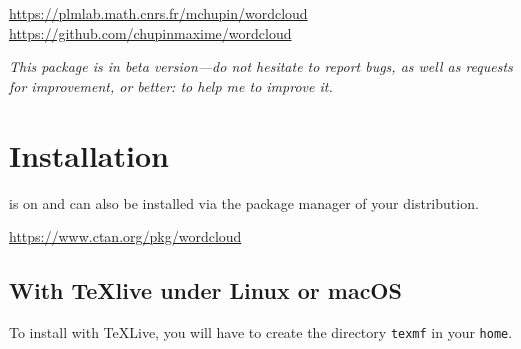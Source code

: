 \documentclass[english]{ltxdoc}
\begin{document}

\begin{abstract}
  These  and  packages allows drawing
  wordclouds from a list of words and weights. The algorithm is implemented with
   whereas Lua is used to parse \LaTeX{} commands, to build
  the list of words and weights from a text file, and to generate
   code interpreted by .
\end{abstract}


\begin{center}
  \url{https://plmlab.math.cnrs.fr/mchupin/wordcloud}
  \url{https://github.com/chupinmaxime/wordcloud}
\end{center}

\tableofcontents

\bigskip

\begin{tcolorbox}[ arc=0pt,outer arc=0pt,
  colback=darkred!3,
  colframe=darkred,
  breakable,
  boxsep=0pt,left=5pt,right=5pt,top=5pt,bottom=5pt, bottomtitle =
  3pt, toptitle=3pt,
  boxrule=0pt,bottomrule=0.5pt,toprule=0.5pt, toprule at break =
  0pt, bottomrule at break = 0pt,]
  \itshape
  This package is in beta version---do not hesitate to report bugs, as well as
  requests for improvement, or better: to help me to improve it. 
\end{tcolorbox}

\section{Installation}

\wordcloudpkg is on \ctan{} and can also be installed via the package manager of your
distribution.

\begin{center}
  \url{https://www.ctan.org/pkg/wordcloud}
\end{center}


\subsection{With \TeX live under Linux or macOS}

To install \wordcloudpkg with \TeX Live, you will have to create the directory
\lstinline+texmf+  in your \lstinline+home+. 
\end{document}
